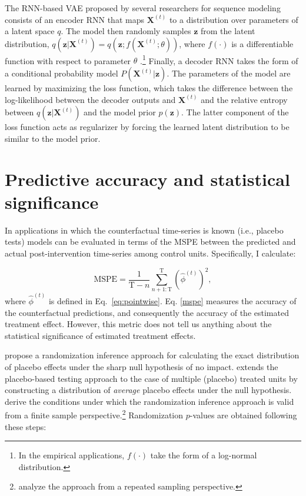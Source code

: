 \documentclass[hidelinks,12pt]{article}
\begin{document}
The RNN-based VAE proposed by several researchers \citep{fabius2014variational, chung2015recurrent,bowman2015generating} for sequence modeling consists of an encoder RNN that maps $\mathbf{X}^{(t)}$ to a distribution over parameters of a latent space $q$. The model then randomly samples $\mathbf{z}$ from the latent distribution, $q(\mathbf{z} | \mathbf{X}^{(t)}) = q (\mathbf{z}; f(\mathbf{X}^{(t)}; \theta))$, where $f(\cdot)$ is a differentiable function with respect to parameter $\theta$ \citep[pp. 699][]{goodfellow2016deep}.\footnote{In the empirical applications, $f(\cdot)$ take the form of a log-normal distribution.} Finally, a decoder RNN takes the form of a conditional probability model $P (\mathbf{X}^{(t)} | \mathbf{z})$. The parameters of the model are learned by maximizing the loss function, which takes the difference between the log-likelihood between the decoder outputs and $\mathbf{X}^{(t)}$ and the relative entropy between  $q(\mathbf{z} | \mathbf{X}^{(t)})$ and the model prior $p (\mathbf{z})$. The latter component of the loss function acts as regularizer by forcing the learned latent distribution to be similar to the model prior. 

\section{Predictive accuracy and statistical significance} \label{eval}

In applications in which the counterfactual time-series is known (i.e., placebo tests) models can be evaluated in terms of the MSPE between the predicted and actual post-intervention time-series among control units. Specifically, I calculate:

\begin{equation}
	\text{MSPE} = \frac{1}{\text{T}-n} \sum_{n+1: \text{T}}^{\text{T}} \left(\hat{\phi}^{(t)} \right)^2, \label{mspe}
\end{equation} where $\hat{\phi}^{(t)}$ is defined in Eq.~\ref{eq:pointwise}. Eq. \ref{mspe} measures the accuracy of the counterfactual predictions, and consequently the accuracy of the estimated treatment effect. However, this metric does not tell us anything about the statistical significance of estimated treatment effects. 

\citet{abadie2010synthetic} propose a randomization inference approach for calculating the exact distribution of placebo effects under the sharp null hypothesis of no impact. \citet{cavallo2013catastrophic} extends the placebo-based testing approach to the case of multiple (placebo) treated units by constructing a distribution of \emph{average} placebo effects under the null hypothesis. \citet{firpo2018synthetic} derive the conditions under which the randomization inference approach is valid from a finite sample perspective.\footnote{\citet{hahn2017synthetic} analyze the approach from a repeated sampling perspective.} Randomization $p$-values are obtained following these steps:
\end{document}
